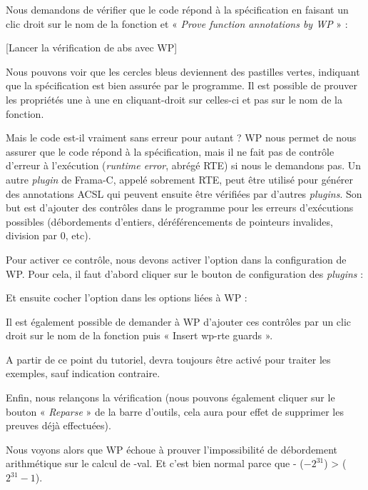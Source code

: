 Nous demandons de vérifier que le code répond à la spécification en faisant
un clic droit sur le nom de la fonction et « \textit{Prove function annotations by WP} » :



[Lancer la vérification de abs avec WP]


Nous pouvons voir que les cercles bleus deviennent des pastilles vertes,
indiquant que la spécification est bien assurée par le programme. Il est
possible de prouver les propriétés une à une en cliquant-droit sur celles-ci
et pas sur le nom de la fonction.



Mais le code est-il vraiment sans erreur pour autant ? WP nous permet de nous
assurer que le code répond à la spécification, mais il ne fait pas de contrôle
d'erreur à l'exécution (\textit{runtime error}, abrégé RTE) si nous le demandons
pas. Un autre \textit{plugin} de Frama-C, appelé sobrement RTE, peut être
utilisé pour générer des annotations ACSL qui peuvent ensuite être vérifiées par
d'autres \textit{plugins}.
Son but est
d'ajouter des contrôles dans le programme pour les erreurs d'exécutions
possibles (débordements d'entiers, déréférencements de pointeurs invalides,
division par 0, etc).



Pour activer ce contrôle, nous devons activer l'option dans la configuration
de WP. Pour cela, il faut d'abord cliquer sur le bouton de configuration des
\textit{plugins} :




Et ensuite cocher l'option  dans les options liées à WP :




Il est également possible de demander à WP d'ajouter ces
contrôles par un clic droit sur le nom de la fonction puis
« Insert wp-rte guards ».


\begin{Information}
  A partir de ce point du tutoriel,  devra toujours être
  activé pour traiter les exemples, sauf indication contraire.
\end{Information}


Enfin, nous relançons la vérification (nous pouvons également cliquer sur le
bouton « \textit{Reparse} » de la barre d'outils, cela aura pour effet de supprimer les
preuves déjà effectuées).



Nous voyons alors que WP échoue à prouver  l'impossibilité de
débordement arithmétique sur le calcul de -val. Et c'est bien normal parce
que - ($-2^{31}$) >  ($2^{31}-1$).



